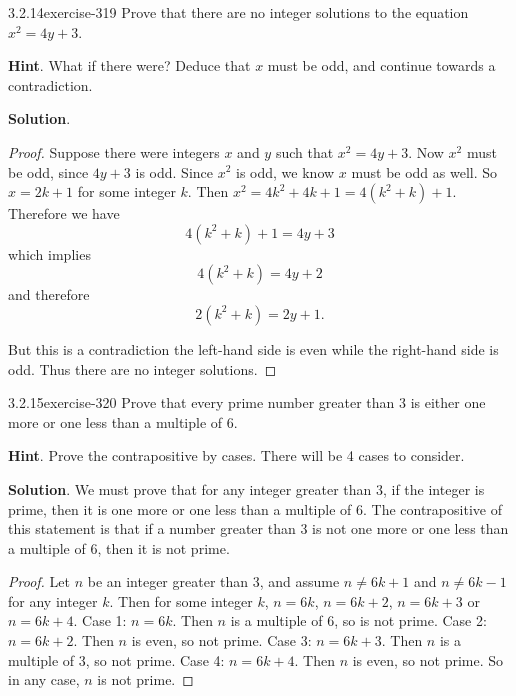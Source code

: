\documentclass[twoside,11pt,]{book}
\numberwithin{equation}{chapter}
\begin{document}
\begin{divisionsolution}{3.2.14}{}{exercise-319}%
\hypertarget{p-4180}{}%
Prove that there are no integer solutions to the equation \(x^2 = 4y + 3\).%
\par\smallskip%
\noindent\textbf{Hint}.\quad%
\hypertarget{p-4181}{}%
What if there were?  Deduce that \(x\) must be odd, and continue towards a contradiction.%
\par\smallskip%
\noindent\textbf{Solution}.\quad%
\begin{proof}{}
\hypertarget{p-4182}{}%
Suppose there were integers \(x\) and \(y\) such that \(x^2 = 4y + 3\). Now \(x^2\) must be odd, since \(4y + 3\) is odd. Since \(x^2\) is odd, we know \(x\) must be odd as well. So \(x = 2k + 1\) for some integer \(k\). Then \(x^2 = 4k^2 + 4k + 1 = 4(k^2 + k) + 1\). Therefore we have%
\begin{equation*}
4(k^2 + k) + 1 = 4y + 3
\end{equation*}
which implies%
\begin{equation*}
4(k^2 + k) = 4y + 2
\end{equation*}
and therefore%
\begin{equation*}
2(k^2 + k) = 2y + 1\text{.}
\end{equation*}
%
\par
\hypertarget{p-4183}{}%
But this is a contradiction \textendash{} the left-hand side is even while the right-hand side is odd. Thus there are no integer solutions.%
\end{proof}
\end{divisionsolution}%
\begin{divisionsolution}{3.2.15}{}{exercise-320}%
\hypertarget{p-4184}{}%
Prove that every prime number greater than 3 is either one more or one less than a multiple of 6.%
\par\smallskip%
\noindent\textbf{Hint}.\quad%
\hypertarget{p-4185}{}%
Prove the contrapositive by cases.  There will be 4 cases to consider.%
\par\smallskip%
\noindent\textbf{Solution}.\quad%
\hypertarget{p-4186}{}%
We must prove that for any integer greater than 3, if the integer is prime, then it is one more or one less than a multiple of 6. The contrapositive of this statement is that if a number greater than 3 is not one more or one less than a multiple of 6, then it is not prime.%
\begin{proof}{}
\hypertarget{p-4187}{}%
Let \(n\) be an integer greater than 3, and assume \(n \ne 6k+1\) and \(n \ne 6k-1\) for any integer \(k\). Then for some integer \(k\), \(n = 6k\), \(n = 6k+2\), \(n = 6k+3\) or \(n = 6k+4\). Case 1: \(n = 6k\). Then \(n\) is a multiple of 6, so is not prime. Case 2: \(n = 6k+2\). Then \(n\) is even, so not prime. Case 3: \(n = 6k+3\). Then \(n\) is a multiple of 3, so not prime. Case 4: \(n = 6k+4\). Then \(n\) is even, so not prime. So in any case, \(n\) is not prime.%
\end{proof}
\end{divisionsolution}%
\end{document}
